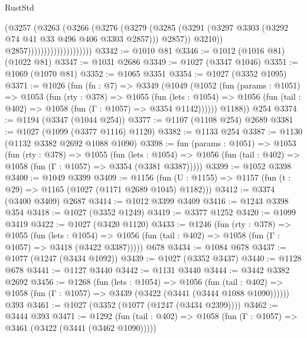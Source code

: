 \begin{lexlean}{RustStd}
\begin{coremodule}
                                        (@3257
                                          (@3263
                                            (@3266
                                              (@3276
                                                (@3279
                                                  (@3285
                                                    (@3291
                                                      (@3297
                                                        @3303
                                                        (@3292 @74 @41 @33 @496 @406 @3303 @2857)))
                                                    @2857))
                                                @3210))
                                            @2857))))))))))))))))))))
@3342 := @1010 @81
@3346 := @1012 (@1016 @81) (@1022 @81)
@3347 := @1031 @2686
@3349 := @1027 (@3347 @1046)
@3351 := @1069 (@1070 @81)
@3352 := @1065 @3351
@3354 := @1027 (@3352 @1095)
@3371 := @1026
    (fun (fn : @7) =>
    @3349
      (@1049
        (@1052
          (fun (params : @1051) =>
          @1053
            (fun (rty : @378) =>
            @1055
              (fun (lets : @1054) =>
              @1056 (fun (tail : @402) => @1058 (fun (Γ : @1057) => @3354 @1142))))))
        @1188))
    @254
@3374 := @1194 (@3347 (@1044 @254))
@3377 := @1107 (@1108 @254) @2689
@3381 := @1027 (@1099 (@3377 @1116) @1120)
@3382 := @1133 @254
@3387 := @1130 (@1132 @3382 @2692 @1088 @1090)
@3398 := fun (params : @1051) =>
  @1053
    (fun (rty : @378) =>
    @1055
      (fun (lets : @1054) =>
      @1056 (fun (tail : @402) => @1058 (fun (Γ : @1057) => @3354 (@3381 @3387)))))
@3399 := @1052 @3398
@3400 := @1049 @3399
@3409 := @1156 (fun (U : @1155) => @1157 (fun (t : @29) => @1165 (@1027 (@1171 @2689 @1045) @1182)))
@3412 := @3374 (@3400 @3409) @2687
@3414 := @1012 @3399 @3409
@3416 := @1243 @3398 @354
@3418 := @1027 (@3352 @1249)
@3419 := @3377 @1252
@3420 := @1099 @3419
@3422 := @1027 (@3420 @1120)
@3433 := @1246
    (fun (rty : @378) =>
    @1055
      (fun (lets : @1054) =>
      @1056 (fun (tail : @402) => @1058 (fun (Γ : @1057) => @3418 (@3422 @3387)))))
    @678
@3434 := @1084 @678
@3437 := @1077 (@1247 (@3434 @1092))
@3439 := @1027 (@3352 @3437)
@3440 := @1128 @678
@3441 := @1127 @3440
@3442 := @1131 @3440
@3444 := @3442 @3382 @2692
@3456 := @1268
    (fun (lets : @1054) =>
    @1056
      (fun (tail : @402) => @1058 (fun (Γ : @1057) => @3439 (@3422 (@3441 (@3444 @1088 @1090))))))
    @393
@3461 := @1027 (@3352 (@1077 (@1247 (@3434 @2399))))
@3462 := @3444 @393
@3471 := @1292
    (fun (tail : @402) => @1058 (fun (Γ : @1057) => @3461 (@3422 (@3441 (@3462 @1090)))))

\end{coremodule}
\end{lexlean}
